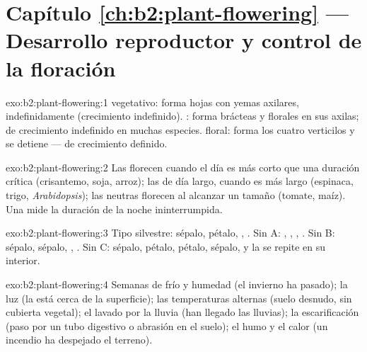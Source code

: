 \section*{Capítulo \ref{ch:b2:plant-flowering} --- Desarrollo reproductor y control de la floración}

\begin{solution}{exo:b2:plant-flowering:1}
 vegetativo: forma hojas con yemas axilares, indefinidamente
(crecimiento indefinido). : forma brácteas y
 florales en sus axilas; de crecimiento indefinido en muchas
especies.  floral: forma los cuatro verticilos y se detiene ---
de crecimiento definido.
\end{solution}

\begin{solution}{exo:b2:plant-flowering:2}
Las  florecen cuando el día es más corto que una
duración crítica (crisantemo, soja, arroz); las de día largo, cuando es
más largo (espinaca, trigo, \emph{Arabidopsis}); las neutras florecen al
alcanzar un tamaño (tomate, maíz). Una  mide la
duración de la noche ininterrumpida.
\end{solution}

\begin{solution}{exo:b2:plant-flowering:3}
Tipo silvestre: sépalo, pétalo, , . Sin A: ,
, , . Sin B: sépalo, sépalo, , . Sin
C: sépalo, pétalo, pétalo, sépalo, y la  se repite en su interior.
\end{solution}

\begin{solution}{exo:b2:plant-flowering:4}
Semanas de frío y humedad (el invierno ha pasado); la luz (la  está
cerca de la superficie); las temperaturas alternas (suelo desnudo, sin
cubierta vegetal); el lavado por la lluvia (han llegado las lluvias); la
escarificación (paso por un tubo digestivo o abrasión en el suelo); el
humo y el calor (un incendio ha despejado el terreno).
\end{solution}


